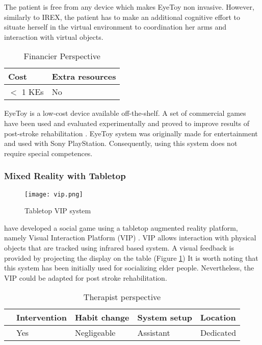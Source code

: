 \documentclass[preprint,authoryear,12pt]{elsarticle}
\begin{document}
The patient is free from any device which makes EyeToy non invasive. However, similarly to IREX, the patient has to make an additional cognitive effort to situate herself in the virtual environment to coordination her arms and interaction with virtual objects.

\begin{table}[h]
\caption{Financier Perspective}
\center
\label{tab:finaper}
\begin{tabular}{|l|l|}
\hline
 Cost & Extra resources \\
\hline
$<$ 1 KEs &  No\\
\hline
\end{tabular}
\end{table}

EyeToy is a low-cost device available off-the-shelf. A set of commercial games have been used and evaluated experimentally and proved to improve results of post-stroke rehabilitation \citep{Yavuzer2008}. EyeToy system was originally made for entertainment and used with Sony PlayStation. Consequently, using this system does not require special competences.


\par
\subsubsection{Mixed Reality with Tabletop}
\par



\begin{figure}[h]
	\centering
\texttt{[image: vip.png]}
\caption{Tabletop VIP system \citep{AlMahmud2008}}
	\label{fig:vip}
\end{figure}
\citep{AlMahmud2008} have developed a social game using a tabletop augmented reality platform, namely Visual Interaction Platform (VIP) \citep{Aliakseyeu2001}. VIP allows interaction with physical objects that are tracked using infrared based system. A visual feedback is provided by projecting the display on the table (Figure \ref{fig:vip}) It is worth noting that this system has been initially used for socializing elder people. Nevertheless, the VIP could be adapted for post stroke rehabilitation.

\begin{table}[h]
\caption{Therapist perspective}
\center
\label{tab:theraper}
\begin{tabular}{|l|l|l|l|l|}
\hline
& Intervention & Habit change & System setup &	Location \\
\hline
\citep{AlMahmud2008} & Yes &  Negligeable	 & Assistant	 & Dedicated\\
\hline
\end{tabular}
\end{table}
\end{document}
